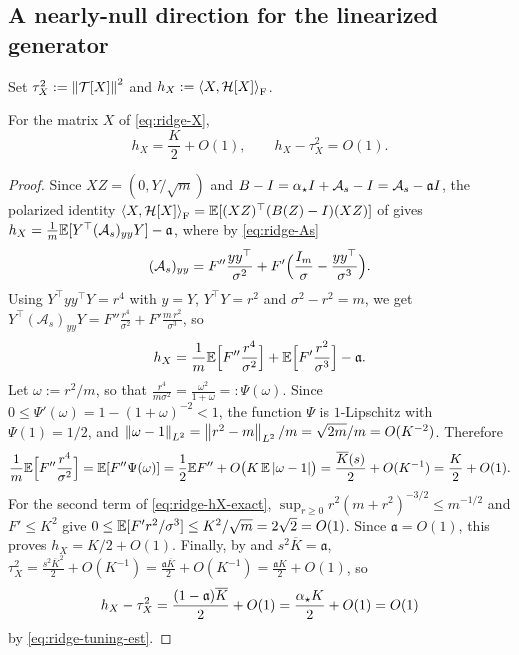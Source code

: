 \subsection{A nearly-null direction for the linearized generator}

Set $\tau_X^2:=\left\lVert \mathcal T[X]\right\rVert^2$ and $h_X:=\left\langle X,\mathcal H[X]\right\rangle_{\mathrm{F}}$.

\begin{lemma}
\label{lem:ridge-hX}
For the matrix $X$ of \eqref{eq:ridge-X},
\begin{equation}
\label{eq:ridge-hX}
    h_X=\frac K2+O(1),
    \qquad
    h_X-\tau_X^2=O(1).
\end{equation}
\end{lemma}

\begin{proof}
Since $XZ=(0,Y/\sqrt m)$ and $B-I=\alpha_\star I+\mathcal A_s-I=\mathcal A_s-\mathfrak aI$,
the polarized identity $\left\langle X,\mathcal H[X]\right\rangle_{\mathrm{F}}=\mathbb{E}[(XZ)^\top(B(Z)-I)(XZ)]$ of
 gives $h_X=\tfrac1m\mathbb{E}[Y^\top(\mathcal A_s)_{yy}Y]-\mathfrak a$, where by
\eqref{eq:ridge-As}
\[
    (\mathcal A_s)_{yy}=F''\frac{yy^\top}{\sigma^2}+F'\Bigl(\frac{I_m}\sigma-\frac{yy^\top}{\sigma^3}\Bigr).
\]
Using $Y^\top yy^\top Y=r^4$ with $y=Y$, $Y^\top Y=r^2$ and $\sigma^2-r^2=m$, we get
$Y^\top(\mathcal A_s)_{yy}Y=F''\tfrac{r^4}{\sigma^2}+F'\tfrac{m\,r^2}{\sigma^3}$, so
\begin{equation}
\label{eq:ridge-hX-exact}
    h_X=\frac1m\mathbb{E}\Bigl[F''\frac{r^4}{\sigma^2}\Bigr]+\mathbb{E}\Bigl[F'\frac{r^2}{\sigma^3}\Bigr]-\mathfrak a .
\end{equation}
Let $\omega:=r^2/m$, so that $\tfrac{r^4}{m\sigma^2}=\tfrac{\omega^2}{1+\omega}=:\Psi(\omega)$.
Since $0\leq\Psi'(\omega)=1-(1+\omega)^{-2}<1$, the function $\Psi$ is $1$-Lipschitz with
$\Psi(1)=1/2$, and
$\left\lVert \omega-1\right\rVert_{L^2}=\left\lVert r^2-m\right\rVert_{L^2}/m=\sqrt{2m}/m=O(K^{-2})$. Therefore
\[
    \frac1m\mathbb{E}\Bigl[F''\frac{r^4}{\sigma^2}\Bigr]
    =\mathbb{E}[F''\Psi(\omega)]
    =\frac12\mathbb{E} F''+O\bigl(K\,\mathbb{E}\left\lvert \omega-1\right\rvert\bigr)
    =\frac{\overline K(s)}2+O(K^{-1})=\frac K2+O(1).
\]
For the second term of \eqref{eq:ridge-hX-exact}, $\sup_{r\geq0}r^2(m+r^2)^{-3/2}\leq m^{-1/2}$
and $F'\leq K^2$ give $0\leq\mathbb{E}[F'r^2/\sigma^3]\leq K^2/\sqrt m=2\sqrt2=O(1)$. Since
$\mathfrak a=O(1)$, this proves $h_X=K/2+O(1)$. Finally, by  and
$s^2\overline K=\mathfrak a$,
$\tau_X^2=\tfrac{s^2\overline K^2}2+O(K^{-1})=\tfrac{\mathfrak a\overline K}2+O(K^{-1})=\tfrac{\mathfrak aK}2+O(1)$,
so
\[
    h_X-\tau_X^2=\frac{(1-\mathfrak a)\overline K}2+O(1)=\frac{\alpha_\star K}2+O(1)=O(1)
\]
by \eqref{eq:ridge-tuning-est}.
\end{proof}

